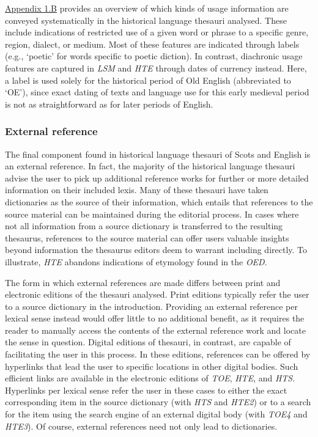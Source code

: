 \hyperref[Appendix1.B]{Appendix 1.B} provides an overview of which kinds of usage information are conveyed systematically in the historical language thesauri analysed. These include indications of restricted use of a given word or phrase to a specific genre, region, dialect, or medium. Most of these features are indicated through labels (e.g., `poetic' for words specific to poetic diction). In contrast, diachronic usage features are captured in \textit{LSM} and \textit{HTE} through dates of currency instead. Here, a label is used solely for the historical period of Old English (abbreviated to `OE'), since exact dating of texts and language use for this early medieval period is not as straightforward as for later periods of English. %

\subsubsection{External reference}
\label{sect:Stolk_thes-content:ExternalReference}

The final component found in historical language thesauri of Scots and English is an external reference. In fact, the majority of the historical language thesauri advise the user to pick up additional reference works for further or more detailed information on their included lexis. Many of these thesauri have taken dictionaries as the source of their information, which entails that references to the source material can be maintained during the editorial process. In cases where not all information from a source dictionary is transferred to the resulting thesaurus, references to the source material can offer users valuable insights beyond information the thesaurus editors deem to warrant including directly. To illustrate, \textit{HTE} abandons indications of etymology found in the \textit{OED}.

The form in which external references are made differs between print and electronic editions of the thesauri analysed. Print editions typically refer the user to a source dictionary in the introduction. Providing an external reference per lexical sense instead would offer little to no additional benefit, as it requires the reader to manually access the contents of the external reference work and locate the sense in question. Digital editions of thesauri, in contrast, are capable of facilitating the user in this process. In these editions, references can be offered by hyperlinks that lead the user to specific locations in other digital bodies. Such efficient links are available in the electronic editions of \textit{TOE}, \textit{HTE}, and \textit{HTS}. Hyperlinks per lexical sense refer the user in these cases to either the exact corresponding item in the source dictionary (with \textit{HTS} and \textit{HTE2}) or to a search for the item using the search engine of an external digital body (with \textit{TOE4} and \textit{HTE3}). Of course, external references need not only lead to dictionaries. 

